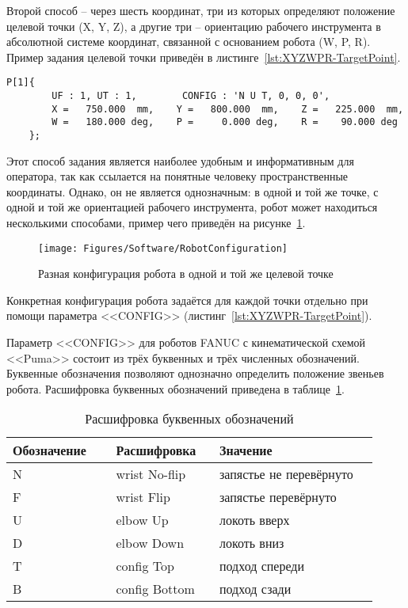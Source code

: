Второй способ -- через шесть координат, три из которых определяют положение целевой точки (X, Y, Z), а другие три -- ориентацию рабочего инструмента в абсолютной системе координат, связанной с основанием робота (W, P, R).
Пример задания целевой точки приведён в листинге~\ref{lst:XYZWPR-TargetPoint}.

\begin{lstlisting}[caption={Задание целевой точки с помощью координат XYZWPR}, label={lst:XYZWPR-TargetPoint}]
	P[1]{
		UF : 1, UT : 1,        CONFIG : 'N U T, 0, 0, 0',
		X =   750.000  mm,    Y =   800.000  mm,    Z =   225.000  mm,
		W =   180.000 deg,    P =     0.000 deg,    R =    90.000 deg
	};
\end{lstlisting}

Этот способ задания является наиболее удобным и информативным для оператора, так как ссылается на понятные человеку пространственные координаты.
Однако, он не является однозначным: в одной и той же точке, с одной и той же ориентацией рабочего инструмента, робот может находиться несколькими способами, пример чего приведён на рисунке~\ref{fig:RobotConfiguration}.

\begin{figure}[H]
    \centering
    \vspace{14pt}
    \texttt{[image: Figures/Software/RobotConfiguration]}
    \caption{Разная конфигурация робота в одной и той же целевой точке}
    \label{fig:RobotConfiguration}
\end{figure}

Конкретная конфигурация робота задаётся для каждой точки отдельно при помощи параметра <<CONFIG>> (листинг~\ref{lst:XYZWPR-TargetPoint}).

Параметр <<CONFIG>> для роботов FANUC с кинематической схемой <<Puma>> состоит из трёх буквенных и трёх численных обозначений.
Буквенные обозначения позволяют однозначно определить положение звеньев робота.
Расшифровка буквенных обозначений приведена в таблице~\ref{tab:RobotConfig}.

\begin{table}[H]
    \caption{Расшифровка буквенных обозначений}
    \label{tab:RobotConfig}
    \begin{tabular}{|p{0.26\linewidth}|p{0.26\linewidth}|p{0.4\linewidth}|}
        \hline
        Обозначение & Расшифровка   & Значение                \\ \hline
        N             & wrist No-flip & запястье не перевёрнуто \\ \hline
        F             & wrist Flip    & запястье перевёрнуто    \\ \hline
        U             & elbow Up      & локоть вверх            \\ \hline
        D             & elbow Down    & локоть вниз             \\ \hline
        T             & config Top    & подход спереди          \\ \hline
        B             & config Bottom & подход сзади            \\ \hline
    \end{tabular}
\end{table}

